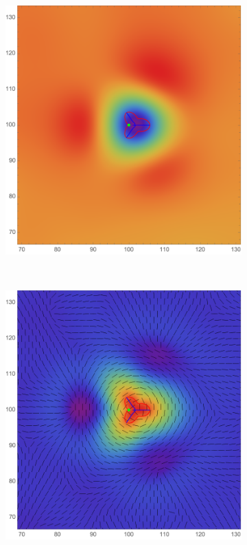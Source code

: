 \documentclass[a4paper, 11pt]{article}
\begin{document}
\begin{figure}
\centering
\begin{subfigure}[b]{0.32\textwidth}
\includegraphics[width=\textwidth]{Hyperbolic_mean_Phi}
\end{subfigure}~
\begin{subfigure}[b]{0.32\textwidth}
\includegraphics[width=\textwidth]{Hyperbolic_mean_L}

\end{subfigure}
\end{figure}
\end{document}
